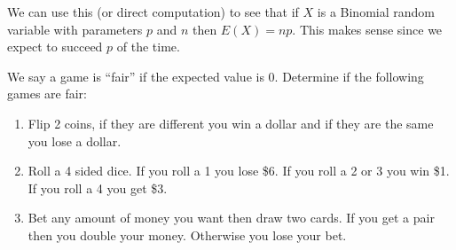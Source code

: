 \documentclass[14,fleqn]{article}
\begin{document}
We can use this (or direct computation) to see that if $X$ is a Binomial random variable with parameters $p$ and $n$ then $E(X)=np.$ This makes sense since we expect to succeed $p$ of the time.

We say a game is ``fair'' if the expected value is 0. Determine if the following games are fair:
\begin{enumerate}
	\item Flip 2 coins, if they are different you win a dollar and if they are the same you lose a dollar.
	\item Roll a 4 sided dice. If you roll a 1 you lose \$6. If you roll a 2 or 3 you win \$1. If you roll a 4 you get \$3.
	\item Bet any amount of money you want then draw two cards. If you get a pair then you double your money. Otherwise you lose your bet.
\end{enumerate}
\end{document}
